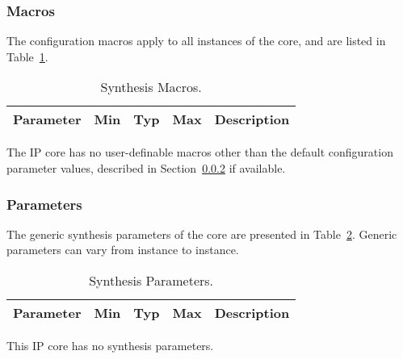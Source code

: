 \subsubsection{Macros}

\ifdefined\SM

The configuration macros apply to all instances of the core, and are listed in
Table~\ref{tab:sm}.

\begin{table}[h]
  \centering
    \begin{tabularx}{\textwidth}{ | c | c | c | c | X | }
    \hline
    \rowcolor{iob-green}
    {\bf Parameter} & {\bf Min} & {\bf Typ} & {\bf Max} & {\bf Description} \\\hline

    

    \end{tabularx}
  \caption{Synthesis Macros.}
  \label{tab:sm}
\end{table}

\noindent

\else
The IP core has no user-definable macros other than the default configuration parameter values, described in Section~\ref{sec:cp} if available.
\fi


\subsubsection{Parameters}
\label{sec:cp}
\ifdefined\SP

The generic synthesis parameters of the core are presented in
Table~\ref{tab:sp}. Generic parameters can vary from instance to instance.

\begin{table}[h]
  \centering
    \begin{tabularx}{\textwidth}{ | c | c | c | c | X | }
    \hline
    \rowcolor{iob-green}
    {\bf Parameter} & {\bf Min} & {\bf Typ} & {\bf Max} & {\bf Description} \\\hline

    

    \end{tabularx}
    
\caption{Synthesis Parameters.}
  \label{tab:sp}
\end{table}

\else

This IP core has no synthesis parameters.

\fi
